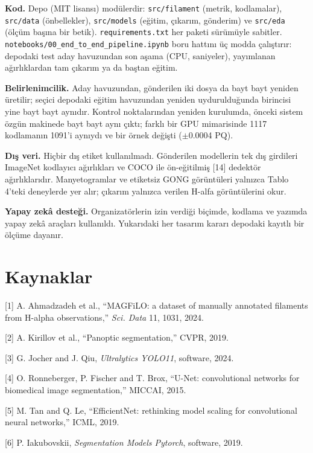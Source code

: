 \textbf{Kod.} Depo (MIT lisansı) modülerdir: \texttt{src/filament} (metrik, kodlamalar), \texttt{src/data}
(önbellekler), \texttt{src/models} (eğitim, çıkarım, gönderim) ve \texttt{src/eda} (ölçüm başına bir betik).
\texttt{requirements.txt} her paketi sürümüyle sabitler. \texttt{notebooks/00\_end\_to\_end\_pipeline.ipynb} boru
hattını üç modda çalıştırır: depodaki test aday havuzundan son aşama (CPU, saniyeler), yayımlanan
ağırlıklardan tam çıkarım ya da baştan eğitim.

\textbf{Belirlenimcilik.} Aday havuzundan, gönderilen iki dosya da bayt bayt yeniden üretilir; seçici
depodaki eğitim havuzundan yeniden uydurulduğunda birincisi yine bayt bayt aynıdır. Kontrol
noktalarından yeniden kurulumda, önceki sistem özgün makinede bayt bayt aynı çıktı; farklı bir GPU
mimarisinde 1117 kodlamanın 1091'i aynıydı ve bir örnek değişti ($\pm$0.0004 PQ).

\textbf{Dış veri.} Hiçbir dış etiket kullanılmadı. Gönderilen modellerin tek dış girdileri ImageNet
kodlayıcı ağırlıkları ve COCO ile ön-eğitilmiş {[}14{]} dedektör ağırlıklarıdır. Manyetogramlar ve
etiketsiz GONG görüntüleri yalnızca Tablo 4'teki deneylerde yer alır; çıkarım yalnızca verilen
H-alfa görüntülerini okur.

\textbf{Yapay zekâ desteği.} Organizatörlerin izin verdiği biçimde, kodlama ve yazımda yapay zekâ
araçları kullanıldı. Yukarıdaki her tasarım kararı depodaki kayıtlı bir ölçüme dayanır.

\section{Kaynaklar}\label{kaynaklar}

{[}1{]} A. Ahmadzadeh et al., ``MAGFiLO: a dataset of manually annotated filaments from H-alpha observations,'' \emph{Sci. Data} 11, 1031, 2024.

{[}2{]} A. Kirillov et al., ``Panoptic segmentation,'' CVPR, 2019.

{[}3{]} G. Jocher and J. Qiu, \emph{Ultralytics YOLO11}, software, 2024.

{[}4{]} O. Ronneberger, P. Fischer and T. Brox, ``U-Net: convolutional networks for biomedical image segmentation,'' MICCAI, 2015.

{[}5{]} M. Tan and Q. Le, ``EfficientNet: rethinking model scaling for convolutional neural networks,'' ICML, 2019.

{[}6{]} P. Iakubovskii, \emph{Segmentation Models Pytorch}, software, 2019.

